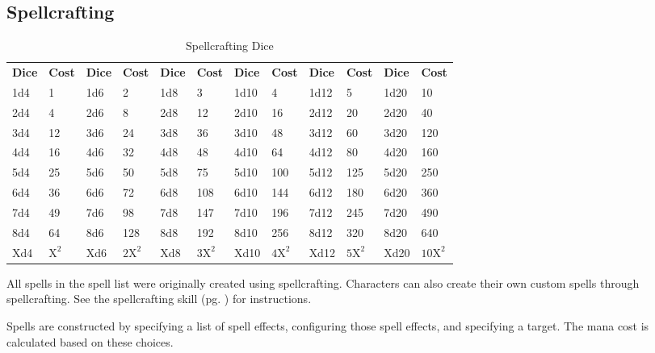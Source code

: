 
\begin{multicols*}{2}
    \section{Spellcrafting}
    \begin{table*}[ht]
        \unclassedrowcolors
        \begin{tabularx}{\textwidth}{l X l X l X l X l X l X}
            \textbf{Dice} & \textbf{Cost} & \textbf{Dice} & \textbf{Cost} & \textbf{Dice} & \textbf{Cost} & \textbf{Dice} & \textbf{Cost} & \textbf{Dice} & \textbf{Cost} & \textbf{Dice} & \textbf{Cost} \\
            1d4 & 1   & 1d6 & 2    & 1d8 & 3    & 1d10 & 4    & 1d12 & 5    & 1d20 & 10    \\
            2d4 & 4   & 2d6 & 8    & 2d8 & 12   & 2d10 & 16   & 2d12 & 20   & 2d20 & 40    \\
            3d4 & 12  & 3d6 & 24   & 3d8 & 36   & 3d10 & 48   & 3d12 & 60   & 3d20 & 120   \\
            4d4 & 16  & 4d6 & 32   & 4d8 & 48   & 4d10 & 64   & 4d12 & 80   & 4d20 & 160   \\
            5d4 & 25  & 5d6 & 50   & 5d8 & 75   & 5d10 & 100  & 5d12 & 125  & 5d20 & 250   \\
            6d4 & 36  & 6d6 & 72   & 6d8 & 108  & 6d10 & 144  & 6d12 & 180  & 6d20 & 360   \\
            7d4 & 49  & 7d6 & 98   & 7d8 & 147  & 7d10 & 196  & 7d12 & 245  & 7d20 & 490   \\
            8d4 & 64  & 8d6 & 128  & 8d8 & 192  & 8d10 & 256  & 8d12 & 320  & 8d20 & 640   \\
            Xd4 & $\text{X}^\text{2}$ & Xd6 & $\text{2X}^\text{2}$ & Xd8 & $\text{3X}^\text{2}$ & Xd10 & $\text{4X}^\text{2}$ & Xd12 & $\text{5X}^\text{2}$ & Xd20 & $\text{10X}^\text{2}$ \\
        \end{tabularx}
        \caption{Spellcrafting Dice}
        \label{tab:spellcrafting-dice}
    \end{table*}

    All spells in the spell list were originally created using spellcrafting.
    Characters can also create their own custom spells through spellcrafting.
    See the spellcrafting skill (pg. \pageref{skill:spellcrafting}) for
    instructions.

    Spells are constructed by specifying a list of spell effects, configuring
    those spell effects, and specifying a target. The mana cost is calculated
    based on these choices.


\end{multicols*}
